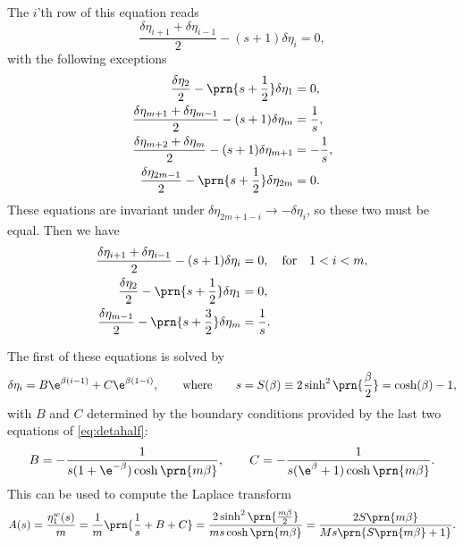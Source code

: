 \documentclass[12pt]{article}
\newcommand{\etwm}{\eta^w}
\begin{document}
The \(i\)'th row of this equation reads
%
\begin{equation}\label{eq:detarow}
  \frac{\delta\eta_{i+1}+\delta\eta_{i-1}}{2} - (s+1)\delta\eta_i = 0,
\end{equation}
%
with the following exceptions
%
\begin{equation}\label{eq:detabnduni}
\begin{aligned}
  \frac{\delta\eta_2}{2} - \prn{s+\frac{1}{2}}\delta\eta_1 &= 0, \\
  \frac{\delta\eta_{m+1}+\delta\eta_{m-1}}{2} - (s+1)\delta\eta_{m} &= \frac{1}{s},\\
  \frac{\delta\eta_{m+2}+\delta\eta_{m}}{2} - (s+1)\delta\eta_{m+1} &= -\frac{1}{s},\\
  \frac{\delta\eta_{2m-1}}{2} - \prn{s+\frac{1}{2}}\delta\eta_{2m} &= 0.
\end{aligned}
\end{equation}
%
These equations are invariant under \(\delta\eta_{2m+1-i} \to -\delta\eta_i\), so these two must be equal.
Then we have
%
\begin{equation}\label{eq:detahalf}
\begin{aligned}
  \frac{\delta\eta_{i+1}+\delta\eta_{i-1}}{2} - (s+1)\delta\eta_i &= 0,
  \quad\text{for}\quad 1<i<m, \\
  \frac{\delta\eta_2}{2} - \prn{s+\frac{1}{2}}\delta\eta_1 &= 0, \\
  \frac{\delta\eta_{m-1}}{2} - \prn{s+\frac{3}{2}}\delta\eta_{m} &= \frac{1}{s}.
\end{aligned}
\end{equation}
%

The first of these equations is solved by
%
\begin{equation}\label{eq:detagensol}
  \delta\eta_i = B\e^{\beta(i-1)} + C\e^{\beta(1-i)},
  \qquad\text{where}\qquad
  s = S(\beta) \equiv 2 \sinh^2 \prn{\frac{\beta}{2}}
    = \cosh (\beta) - 1,
\end{equation}
%
with \(B\) and \(C\) determined by the boundary conditions provided by the last two equations of \eqref{eq:detahalf}:
%
\begin{equation}\label{eq:unicoeffs}
  B = -\frac{1}{s(1 + \e^{-\beta}) \cosh \prn{m \beta}},
  \qquad
  C = -\frac{1}{s(\e^{\beta} + 1) \cosh \prn{m \beta}}.
\end{equation}
%
This can be used to compute the Laplace transform
%
\begin{equation}\label{eq:unilaplace}
  A(s) = \frac{\etwm_1(s)}{m}
   = \frac{1}{m}\prn{\frac{1}{s}+B+C}
   = \frac{2\sinh^2\prn{\frac{m \beta}{2}}}{m s \cosh\prn{m \beta}}
   = \frac{2 S\prn{m \beta}}{M s \prn{S\prn{m \beta} + 1}}.
\end{equation}
%
\end{document}
